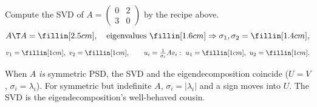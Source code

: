 \begin{yourturn}
Compute the SVD of $\displaystyle A=\begin{pmatrix}0&2\\3&0\end{pmatrix}$ by the recipe above.
\[
  A\T A=\fillin[2.5cm],\quad \text{eigenvalues } \fillin[1.6cm]\Rightarrow \sigma_1,\sigma_2=\fillin[1.4cm],
\]
\[
  v_1=\fillin[1cm],\ v_2=\fillin[1cm],\qquad
  u_i=\tfrac{1}{\sigma_i}Av_i:\ u_1=\fillin[1cm],\ u_2=\fillin[1cm].
\]
\end{yourturn}

\begin{strand}
When $A$ \emph{is} symmetric PSD, the SVD and the eigendecomposition coincide ($U=V$,
$\sigma_i=\lambda_i$). For symmetric but indefinite $A$, $\sigma_i=|\lambda_i|$ and a sign moves
into $U$. The SVD is the eigendecomposition's well-behaved cousin.
\end{strand}
